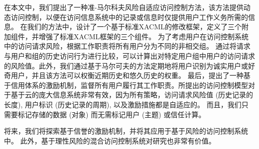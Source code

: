 在本文中，我们提出了一种准-马尔科夫风险自适应访问控制方法，该方法提供动态访问控制，以便在访问信息系统中的记录或信息时仅提供用户工作义务所需的信息。 在我们的方法中，设计了一个基于标准XACML的修改框架，定义了三个附加组件，并增强了标准XACML框架的三个组件。 为了考虑用户在访问控制系统中的访问请求风险，根据工作职责将所有用户分为不同的非相交组。 通过将请求与用户和组的历史访问行为进行比较，可以计算出对特定用户组中用户的访问请求的风险值。此外，我们通过基于马尔可夫的方法定期地将用户识别为诚实用户或好奇用户，并且该方法可以权衡近期历史和悠久历史的权重。 最后，提出了一种基于信用体系的激励机制，监督所有用户履行其工作职责。所提出的访问控制模型对于基于云的庞大信息系统非常有效，因为所有策略，访问请求风险值 (历史记录的长度), 用户标识 (历史记录的周期), 以及激励措施都是自适应的。  而且，我们只需要标记存储的数据 (对象) 而无需标记用户 (主题) 或信任计算。

将来，我们将探索基于信誉的激励机制，并将其应用于基于风险的访问控制系统中。 此外，基于理性风险的混合访问控制系统对研究也非常有价值。
